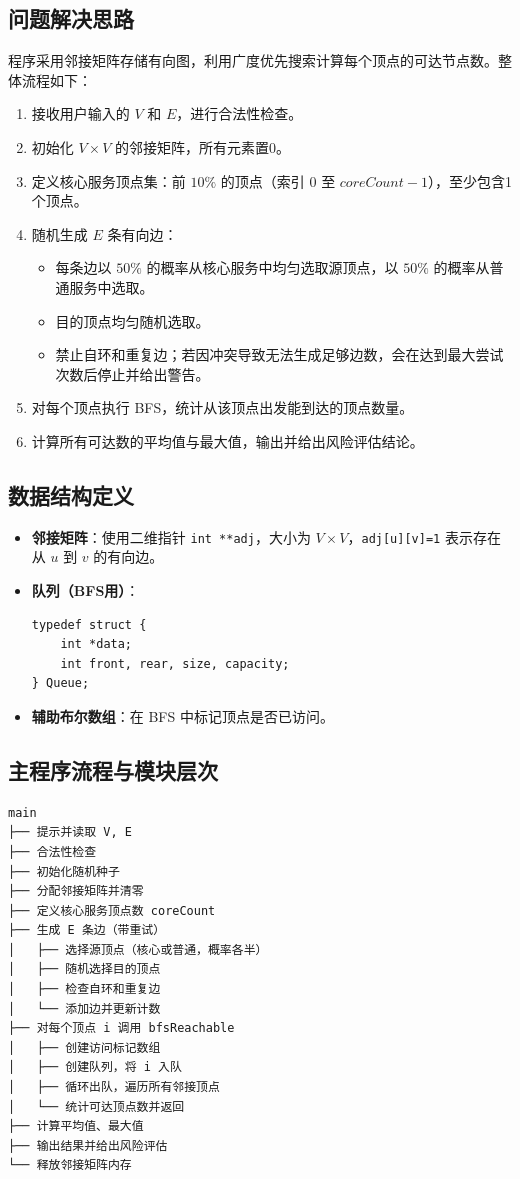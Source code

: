 \documentclass[UTF8]{ctexart}
\begin{document}
\subsection{问题解决思路}
程序采用邻接矩阵存储有向图，利用广度优先搜索计算每个顶点的可达节点数。整体流程如下：
\begin{enumerate}
    \item 接收用户输入的 \(V\) 和 \(E\)，进行合法性检查。
    \item 初始化 \(V \times V\) 的邻接矩阵，所有元素置0。
    \item 定义核心服务顶点集：前 \(10\%\) 的顶点（索引 \(0\) 至 \(coreCount-1\)），至少包含1个顶点。
    \item 随机生成 \(E\) 条有向边：
        \begin{itemize}
            \item 每条边以 \(50\%\) 的概率从核心服务中均匀选取源顶点，以 \(50\%\) 的概率从普通服务中选取。
            \item 目的顶点均匀随机选取。
            \item 禁止自环和重复边；若因冲突导致无法生成足够边数，会在达到最大尝试次数后停止并给出警告。
        \end{itemize}
    \item 对每个顶点执行 BFS，统计从该顶点出发能到达的顶点数量。
    \item 计算所有可达数的平均值与最大值，输出并给出风险评估结论。
\end{enumerate}

\subsection{数据结构定义}
\begin{itemize}
    \item \textbf{邻接矩阵}：使用二维指针 \texttt{int **adj}，大小为 \(V \times V\)，\texttt{adj[u][v]=1} 表示存在从 \(u\) 到 \(v\) 的有向边。
    \item \textbf{队列（BFS用）}：
\begin{lstlisting}
typedef struct {
    int *data;
    int front, rear, size, capacity;
} Queue;
\end{lstlisting}
    \item \textbf{辅助布尔数组}：在 BFS 中标记顶点是否已访问。
\end{itemize}

\subsection{主程序流程与模块层次}
\begin{verbatim}
main
├── 提示并读取 V, E
├── 合法性检查
├── 初始化随机种子
├── 分配邻接矩阵并清零
├── 定义核心服务顶点数 coreCount
├── 生成 E 条边（带重试）
│   ├── 选择源顶点（核心或普通，概率各半）
│   ├── 随机选择目的顶点
│   ├── 检查自环和重复边
│   └── 添加边并更新计数
├── 对每个顶点 i 调用 bfsReachable
│   ├── 创建访问标记数组
│   ├── 创建队列，将 i 入队
│   ├── 循环出队，遍历所有邻接顶点
│   └── 统计可达顶点数并返回
├── 计算平均值、最大值
├── 输出结果并给出风险评估
└── 释放邻接矩阵内存
\end{verbatim}
\end{document}
